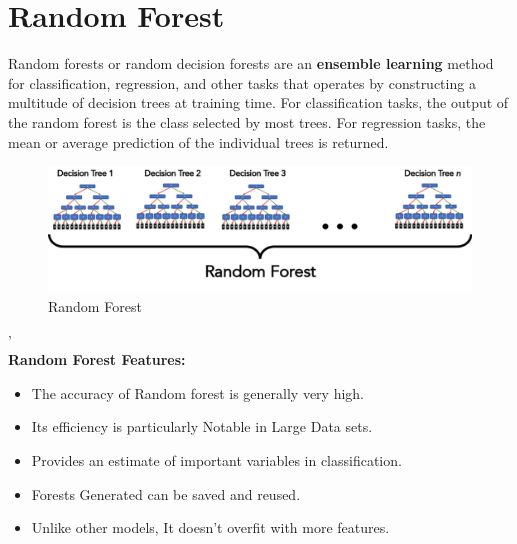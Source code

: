\documentclass{template}
\begin{document}
\section{Random Forest}
Random forests or random decision forests are an \textbf{ensemble learning} method for classification, regression, and other tasks that operates by constructing a multitude of decision trees at training time. For classification tasks, the output of the random forest is the class selected by most trees. For regression tasks, the mean or average prediction of the individual trees is returned.\cite{rf}
\begin{figure}
\includegraphics[scale=0.35]{RandF.jpg}
\caption{Random Forest}
\label{fig:logo}
\end{figure}
'\\
\textbf{Random Forest Features:}
    \begin{itemize}
    \item The accuracy of Random forest is generally very high.
    \item Its efficiency is particularly Notable in Large Data sets.
    \item Provides an estimate of important variables in classification. 
    \item Forests Generated can be saved and reused.
    \item Unlike other models, It doesn't overfit with more features.
\end{itemize}
\end{document}

